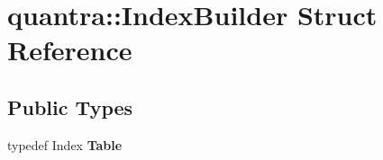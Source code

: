 \hypertarget{structquantra_1_1IndexBuilder}{}\section{quantra\+:\+:Index\+Builder Struct Reference}
\label{structquantra_1_1IndexBuilder}
\subsection*{Public Types}
\begin{DoxyCompactItemize}
\item 
\mbox{\label{structquantra_1_1IndexBuilder_aaadc0cdc1f78704be29d8596439a0c5e}} 
typedef Index {\bfseries Table}
\end{DoxyCompactItemize}
